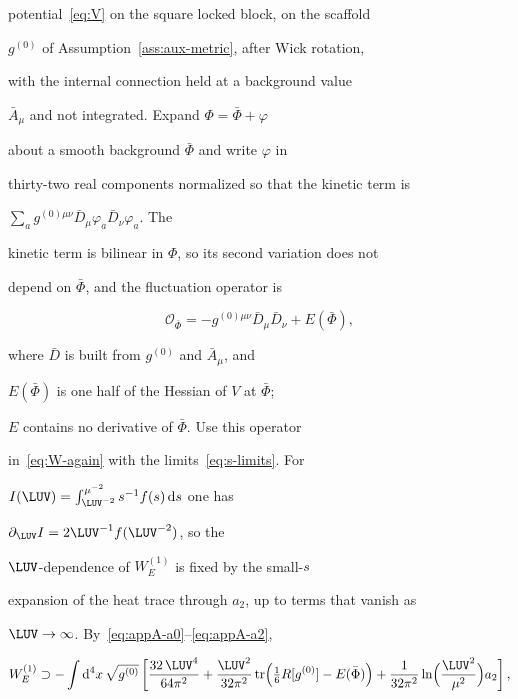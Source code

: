 potential~\eqref{eq:V} on the square locked block, on the scaffold

\(g^{(0)}\) of Assumption~\ref{ass:aux-metric}, after Wick rotation,

with the internal connection held at a background value

\(\bar A_\mu\) and not integrated. Expand \(\Phi=\bar\Phi+\varphi\)

about a smooth background \(\bar\Phi\) and write \(\varphi\) in

thirty-two real components normalized so that the kinetic term is

\(\sum_a g^{(0)\mu\nu}\bar D_\mu\varphi_a\bar D_\nu\varphi_a\). The

kinetic term is bilinear in \(\Phi\), so its second variation does not

depend on \(\bar\Phi\), and the fluctuation operator is

\[

  \mathcal O_{\bar\Phi}

  =-g^{(0)\mu\nu}\bar D_\mu\bar D_\nu+E(\bar\Phi),

\]

where \(\bar D\) is built from \(g^{(0)}\) and \(\bar A_\mu\), and

\(E(\bar\Phi)\) is one half of the Hessian of \(V\) at \(\bar\Phi\);

\(E\) contains no derivative of \(\bar\Phi\). Use this operator

in~\eqref{eq:W-again} with the limits~\eqref{eq:s-limits}. For

\(I(\LUV)=\int_{\LUV^{-2}}^{\mu^{-2}}s^{-1}f(s)\,\mathrm{d}s\) one has

\(\partial_{\LUV}I=2\LUV^{-1}f(\LUV^{-2})\), so the

\(\LUV\)-dependence of \(W_E^{(1)}\) is fixed by the small-\(s\)

expansion of the heat trace through \(a_2\), up to terms that vanish as

\(\LUV\to\infty\). By~\eqref{eq:appA-a0}--\eqref{eq:appA-a2},

\[

  W_E^{(1)}\supset

  -\int\mathrm{d}^4x\,\sqrt{g^{(0)}}\left[

    \frac{32\,\LUV^4}{64\pi^2}

    +\frac{\LUV^2}{32\pi^2}

     \operatorname{tr}\Bigl(\tfrac16R[g^{(0)}]-E(\bar\Phi)\Bigr)

    +\frac{1}{32\pi^2}\ln\Bigl(\frac{\LUV^2}{\mu^2}\Bigr)a_2

  \right],

\]

